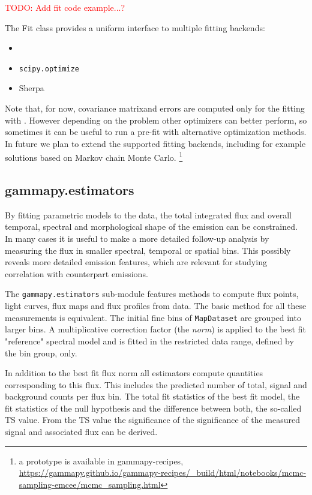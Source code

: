 \documentclass[traditabstract, longauth]{aa}
\newcommand{\todo}[1]{\textcolor{red}{TODO: #1}\PackageWarning{TODO:}{#1!}}
\newcommand{\code}[1]{\texttt{#1}}
\begin{document}
\todo{Add fit code example...?}

The Fit class provides a uniform interface to multiple fitting backends:

\begin{itemize}
	\item \iminuit~\citep{iminuit}
	\item \code{scipy.optimize}~\citep{2020SciPy-NMeth}
	\item Sherpa~\citep{sherpa-2011}
\end{itemize}

Note that, for now, covariance matrixand errors are computed only for the fitting with 
\iminuit. However depending on
the problem other optimizers can better perform, so sometimes it can be useful
to run a pre-fit with alternative optimization methods. In future we plan to
extend the supported fitting backends, including for example solutions based on Markov chain Monte Carlo.
\footnote{a prototype is available in gammapy-recipes,
	\url{https://gammapy.github.io/gammapy-recipes/_build/html/notebooks/mcmc-sampling-emcee/mcmc_sampling.html}
}

\subsection{gammapy.estimators}
\label{ssec:gammapy-estimators}
By fitting parametric models to the data, the total integrated
flux and overall temporal, spectral and morphological shape of the
\gammaray emission can be constrained. In many cases it is useful
to make a more detailed follow-up analysis by measuring the
flux in smaller spectral, temporal or spatial bins. This
possibly reveals more detailed emission features, which
are relevant for studying correlation with counterpart emissions.

The \code{gammapy.estimators} sub-module features methods to compute flux
points, light curves, flux maps and flux profiles from data.
The basic method for all these measurements is equivalent.
The initial fine bins of \code{MapDataset} are grouped into
larger bins. A multiplicative correction factor (the \textit{norm})
is applied to the best fit "reference" spectral
model and is fitted in the restricted data range, defined by the 
bin group, only.

In addition to the best fit flux norm all estimators compute
quantities corresponding to this flux. This includes
the predicted number of total, signal and background
counts per flux bin. The total fit statistics
of the best fit model, the fit statistics of the
null hypothesis and the difference between both,
the so-called TS value.
From the TS value the significance of the
significance of the measured signal and associated flux
can be derived.
\end{document}
